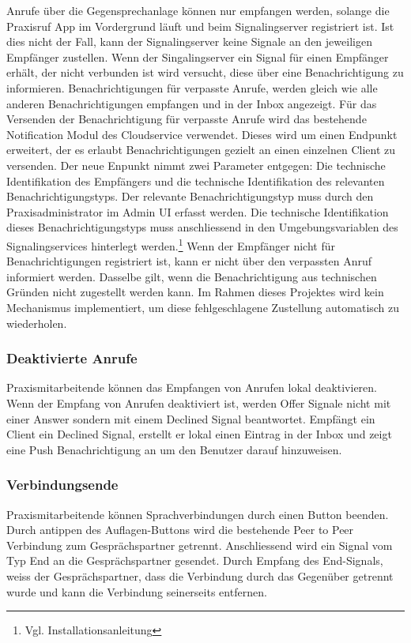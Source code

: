 Anrufe über die Gegensprechanlage können nur empfangen werden, solange die Praxisruf App im Vordergrund läuft und beim Signalingserver registriert ist.
Ist dies nicht der Fall, kann der Signalingserver keine Signale an den jeweiligen Empfänger zustellen.
Wenn der Singalingserver ein Signal für einen Empfänger erhält, der nicht verbunden ist wird versucht, diese über eine Benachrichtigung zu informieren.
Benachrichtigungen für verpasste Anrufe, werden gleich wie alle anderen Benachrichtigungen empfangen und in der Inbox angezeigt.
Für das Versenden der Benachrichtigung für verpasste Anrufe wird das bestehende Notification Modul des Cloudservice verwendet.
Dieses wird um einen Endpunkt erweitert, der es erlaubt Benachrichtigungen gezielt an einen einzelnen Client zu versenden.
Der neue Enpunkt nimmt zwei Parameter entgegen:
Die technische Identifikation des Empfängers und die technische Identifikation des relevanten Benachrichtigungstyps.
Der relevante Benachrichtigungstyp muss durch den Praxisadministrator im Admin UI erfasst werden.
Die technische Identifikation dieses Benachrichtigungstyps muss anschliessend in den Umgebungsvariablen des Signalingservices hinterlegt werden.\footnote{Vgl. Installationsanleitung}
Wenn der Empfänger nicht für Benachrichtigungen registriert ist, kann er nicht über den verpassten Anruf informiert werden.
Dasselbe gilt, wenn die Benachrichtigung aus technischen Gründen nicht zugestellt werden kann.
Im Rahmen dieses Projektes wird kein Mechanismus implementiert, um diese fehlgeschlagene Zustellung automatisch zu wiederholen.

\subsubsection{Deaktivierte Anrufe}

Praxismitarbeitende können das Empfangen von Anrufen lokal deaktivieren.
Wenn der Empfang von Anrufen deaktiviert ist, werden Offer Signale nicht mit einer Answer sondern mit einem Declined Signal beantwortet.
Empfängt ein Client ein Declined Signal, erstellt er lokal einen Eintrag in der Inbox und zeigt eine Push Benachrichtigung an um den Benutzer darauf hinzuweisen.

\subsubsection{Verbindungsende}

Praxismitarbeitende können Sprachverbindungen durch einen Button beenden.
Durch antippen des Auflagen-Buttons wird die bestehende Peer to Peer Verbindung zum Gesprächspartner getrennt.
Anschliessend wird ein Signal vom Typ End an die Gesprächspartner gesendet.
Durch Empfang des End-Signals, weiss der Gesprächspartner, dass die Verbindung durch das Gegenüber getrennt wurde und kann die Verbindung seinerseits entfernen.


\clearpage
